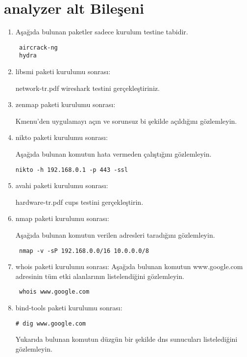 \documentclass[a4paper,10pt]{article}
\begin{document}
\section{analyzer alt Bileşeni}
\begin{enumerate}
\item Aşağıda bulunan paketler sadece kurulum testine tabidir.
\begin{verbatim}
 aircrack-ng
 hydra
\end{verbatim}
\item libsmi paketi kurulumu sonrası:

network-tr.pdf wireshark testini gerçekleştiriniz.

\item zenmap paketi kurulumu sonrası:

Kmenu'den uygulamayı açın ve sorunsuz bi şekilde açıldığını gözlemleyin.

\item nikto paketi kurulumu sonrası:

Aşağıda bulunan komutun hata vermeden çalıştığını gözlemleyin.
\begin{verbatim}
nikto -h 192.168.0.1 -p 443 -ssl 
\end{verbatim}


\item avahi paketi kurulumu sonrası:

hardware-tr.pdf cups testini gerçekleştirin.

\item nmap paketi kurulumu sonrası:

Aşağıda bulunan komutun verilen adresleri taradığını gözlemleyin.
\begin{verbatim}
 nmap -v -sP 192.168.0.0/16 10.0.0.0/8
\end{verbatim}

 
\item whois paketi kurulumu sonrası:
Aşağıda bulunan komutun www.google.com adresinin tüm etki alanlarının listelendiğini gözlemleyin.
\begin{verbatim}
 whois www.google.com
\end{verbatim}


\item bind-tools paketi kurulumu sonrası:

\begin{verbatim}
# dig www.google.com
\end{verbatim}
Yukarıda bulunan komutun düzgün bir şekilde dns sunucuları listelediğini gözlemleyin.


\end{enumerate}
\end{document}
